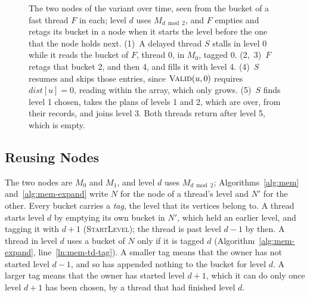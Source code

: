 \begin{figure}
    \caption{The two nodes of the variant over time, seen from the bucket of a fast thread $F$ in each; level $d$ uses $M_{d \bmod 2}$, and $F$ empties and retags its bucket in a node when it starts the level before the one that the node holds next. (1)~A delayed thread $S$ stalls in level 0 while it reads the bucket of $F$, thread 0, in $M_0$, tagged 0. (2,~3)~$F$ retags that bucket 2, and then 4, and fills it with level 4. (4)~$S$ resumes and skips those entries, since $\textsc{Valid}(u, 0)$ requires $\mathit{dist}[u] = 0$, reading within the array, which only grows. (5)~$S$ finds level 1 chosen, takes the plans of levels 1 and 2, which are over, from their records, and joins level 3. Both threads return after level 5, which is empty.}
    \label{fig:mem-protocol}
\end{figure}

\subsection{Reusing Nodes}
\label{sec:mem-reuse}

The two nodes are $M_0$ and $M_1$, and level $d$ uses $M_{d \bmod 2}$; Algorithms~\ref{alg:mem} and~\ref{alg:mem-expand} write $N$ for the node of a thread's level and $N'$ for the other. Every bucket carries a \emph{tag}, the level that its vertices belong to. A thread starts level $d$ by emptying its own bucket in $N'$, which held an earlier level, and tagging it with $d+1$ (\textsc{StartLevel}); the thread is past level $d-1$ by then. A thread in level $d$ uses a bucket of $N$ only if it is tagged $d$ (Algorithm~\ref{alg:mem-expand}, line~\ref{ln:mem-td-tag}). A smaller tag means that the owner has not started level $d-1$, and so has appended nothing to the bucket for level $d$. A larger tag means that the owner has started level $d+1$, which it can do only once level $d+1$ has been chosen, by a thread that had finished level $d$.

